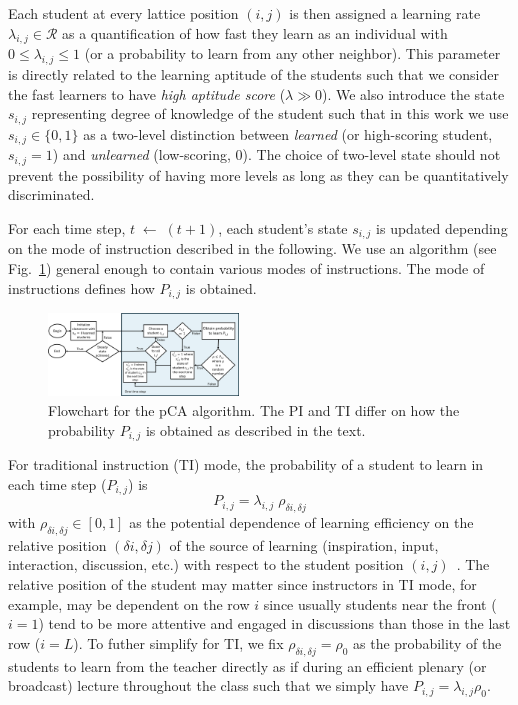 \documentclass[twocolumn,secnumarabic,amssymb, nobibnotes, aps, prd]{revtex4-2}
\begin{document}
    Each student at every lattice position $(i,j)$ is then assigned a learning rate
    $\lambda_{i,j} \in \mathcal{R}$ 
    as a quantification of how fast they learn as an individual with
    $0{\leq}\lambda_{i,j}{\leq}1$
    (or a probability to learn from any other neighbor).
    This parameter is directly related to the learning aptitude of the students such that we consider the fast learners to have {\it high aptitude score} ($\lambda{\gg}0$).
    We also introduce the state $s_{i,j}$ representing degree of knowledge of the student such that in this work we use
    $s_{i,j}\in\lbrace{0,1}\rbrace$
    as a two-level distinction between {\it learned} (or high-scoring student, $s_{i,j}=1$) and {\it unlearned} (low-scoring, $0$).
    The choice of two-level state should not prevent the possibility of having more levels as long as they can be quantitatively discriminated.

    For each time step, $t\;{\leftarrow}\;(t+1)$, each student's state $s_{i,j}$ is updated depending on the mode of instruction described in the following.
    We use an algorithm (see Fig.~\ref{fig:pCA-flowchart}) general enough to contain various modes of instructions.
    The mode of instructions defines how $P_{i,j}$ is obtained.
    \begin{figure}[htb]
        \centering
        \includegraphics[width=0.45\textwidth]{figures/2DBPCA Flowchart.png}
        \caption{%
            Flowchart for the pCA algorithm.
            The PI and TI differ on how the probability $P_{i,j}$ is obtained as described in the text.
        }\label{fig:pCA-flowchart}
    \end{figure}


    For traditional instruction (TI) mode, the probability of a student to learn in each time step ($P_{i,j}$) is
    \begin{equation}
    \label{eq:TI-mode-probability}
        P_{i,j} = \lambda_{i,j}\;\rho_{\delta i,\delta j}
    \end{equation}
    with $\rho_{\delta i,\delta j}\in[0,1]$ as the potential dependence of {learning} efficiency on the relative position $(\delta i, \delta j)$ of the source of learning (inspiration, input, interaction, discussion, etc.) with respect to the student position $(i,j)$~\cite{dong2021influence}.
    The relative position of the student may matter since instructors in TI mode, for example, may be dependent on the row $i$ since usually students near the front ($i=1$) tend to be more attentive and engaged in discussions than those in the last row ($i=L$).
    To futher simplify for TI, we fix $\rho_{\delta i,\delta j}=\rho_{0}$ as the probability of the students to learn from the teacher directly as if during an efficient plenary (or broadcast) lecture throughout the class such that we simply have $P_{i,j} = \lambda_{i,j}\rho_0$.
\end{document}
